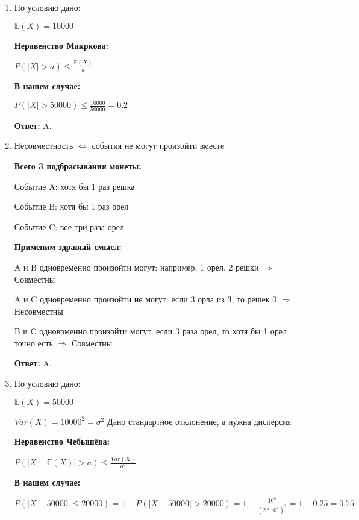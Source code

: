 \documentclass[a4paper]{article} %
\begin{document}
\begin{enumerate}
    
    
    
    
    \item
    По условию дано:
    
    $\mathbb{E}(X) = 10000$
    
    \textbf{Неравенство Макркова:}
    
    $P(\mid X \mid > a) \leq \frac{\mathbb{E}(X)}{a}$
    
    \textbf{В нашем случае:} 
    
    $P(\mid X \mid > 50000) \leq \frac{10000}{50000} = 0.2$
    
    \textbf{Ответ:} A.
    
    
    
    
    \item
    Несовместность $\Leftrightarrow$ события не могут произойти вместе
    
    \textbf{Всего 3 подбрасывания монеты:}
    
    Событие A: хотя бы 1 раз решка

    Событие B: хотя бы 1 раз орел

    Событие C: все три раза орел
    
    \textbf{Применим здравый смысл:}
    
    A и B одновременно произойти могут: например, 1 орел, 2 решки $\Rightarrow$ Совместны
    
    A и C одновременно произойти не могут: если 3 орла из 3, то решек 0 $\Rightarrow$ Несовместны
    
    B и C одноврменно произойти могут: если 3 раза орел, то хотя бы 1 орел точно есть $\Rightarrow$ Совместны
    
    
    
    
    \textbf{Ответ:} A.
    
    
    
    \item
    По условию дано:
    
    $\mathbb{E}(X) = 50000$
    
    $Var(X) = 10000^2 = \sigma^2 $ Дано стандартное отклонение, а нужна дисперсия
    
    \textbf{Неравенство Чебышёва:} 
    
    $P(\mid X - \mathbb{E}(X) \mid > a) \leq \frac{Var(X)}{a^2}$
    
    \textbf{В нашем случае:} 
    
    $P(\mid X - 50000 \mid \leq 20000) = 1 -  P(\mid X - 50000 \mid > 20000) = 1 -  \frac{10^8}{(2* 10^4)^2} = 1 - 0.25 = 0.75 $
    

\end{enumerate}
\end{document}
